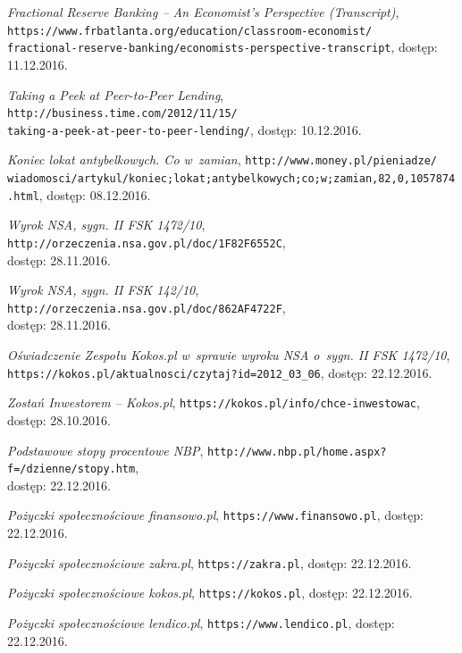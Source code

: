 \documentclass[a4paper,twoside,titlepage,openright]{book}
\begin{document}
\begin{thebibliography}{99}
 \textit{Fractional Reserve Banking -- An Economist's Perspective (Transcript)}, \\
\texttt{https://www.frbatlanta.org/education/classroom-economist/\\fractional-reserve-banking/economists-perspective-transcript}, dostęp: 11.12.2016.

 \textit{Taking a Peek at Peer-to-Peer Lending}, 
\texttt{http://business.time.com/2012/11/15/\\taking-a-peek-at-peer-to-peer-lending/}, dostęp: 10.12.2016.

 \textit{Koniec lokat antybelkowych. Co w~zamian}, 
\texttt{http://www.money.pl/pieniadze/\\wiadomosci/artykul/koniec;lokat;antybelkowych;co;w;zamian,82,0,1057874.html}, dostęp: 08.12.2016.

 \textit{Wyrok NSA, sygn. II FSK 1472/10}, \texttt{http://orzeczenia.nsa.gov.pl/doc/1F82F6552C}, \\dostęp: 28.11.2016.

 \textit{Wyrok NSA, sygn. II FSK 142/10}, 
\texttt{http://orzeczenia.nsa.gov.pl/doc/862AF4722F}, \\dostęp: 28.11.2016.

 \textit{Oświadczenie Zespołu Kokos.pl w~sprawie wyroku NSA o~sygn. II FSK 1472/10}, \\
\texttt{https://kokos.pl/aktualnosci/czytaj?id=2012\_03\_06}, dostęp: 22.12.2016.

 \textit{Zostań Inwestorem -- Kokos.pl}, 
\texttt{https://kokos.pl/info/chce-inwestowac}, \\dostęp: 28.10.2016.

 \textit{Podstawowe stopy procentowe NBP}, 
\texttt{http://www.nbp.pl/home.aspx?f=/dzienne/stopy.htm}, \\dostęp: 22.12.2016.

 \textit{Pożyczki społecznościowe finansowo.pl}, 
\texttt{https://www.finansowo.pl}, dostęp: 22.12.2016.

 \textit{Pożyczki społecznościowe zakra.pl}, 
\texttt{https://zakra.pl}, dostęp: 22.12.2016.

 \textit{Pożyczki społecznościowe kokos.pl}, 
\texttt{https://kokos.pl}, dostęp: 22.12.2016.

 \textit{Pożyczki społecznościowe lendico.pl}, 
\texttt{https://www.lendico.pl}, dostęp: 22.12.2016.


\end{thebibliography}
\end{document}
